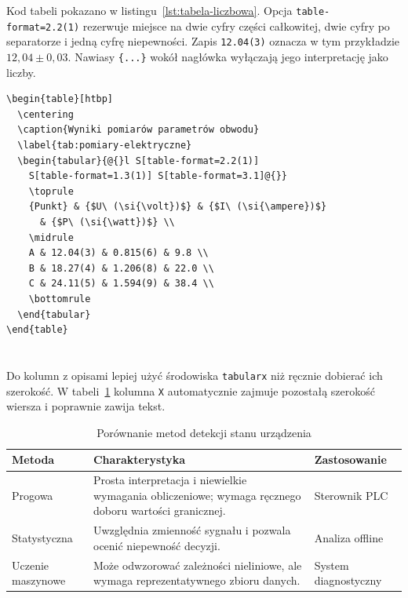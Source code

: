 Kod tabeli pokazano w listingu~\ref{lst:tabela-liczbowa}. Opcja
\verb|table-format=2.2(1)| rezerwuje miejsce na dwie cyfry części całkowitej, dwie
cyfry po separatorze i jedną cyfrę niepewności. Zapis \verb|12.04(3)| oznacza w tym
przykładzie $12{,}04\pm0{,}03$. Nawiasy \verb|{...}| wokół nagłówka wyłączają jego
interpretację jako liczby.

\begin{lstlisting}[style=thesis,caption={Kod tabeli z danymi liczbowymi},label={lst:tabela-liczbowa}]
\begin{table}[htbp]
  \centering
  \caption{Wyniki pomiarów parametrów obwodu}
  \label{tab:pomiary-elektryczne}
  \begin{tabular}{@{}l S[table-format=2.2(1)]
    S[table-format=1.3(1)] S[table-format=3.1]@{}}
    \toprule
    {Punkt} & {$U\ (\si{\volt})$} & {$I\ (\si{\ampere})$}
      & {$P\ (\si{\watt})$} \\
    \midrule
    A & 12.04(3) & 0.815(6) & 9.8 \\
    B & 18.27(4) & 1.206(8) & 22.0 \\
    C & 24.11(5) & 1.594(9) & 38.4 \\
    \bottomrule
  \end{tabular}
\end{table}
\end{lstlisting}

\section{}

Do kolumn z opisami lepiej użyć środowiska \texttt{tabularx} niż ręcznie dobierać ich
szerokość. W tabeli~\ref{tab:porownanie-metod} kolumna \texttt{X} automatycznie zajmuje
pozostałą szerokość wiersza i poprawnie zawija tekst.

\begin{table}[htbp]
  \centering
  \caption{Porównanie metod detekcji stanu urządzenia}
  \label{tab:porownanie-metod}
  \begin{tabularx}{\linewidth}{@{}lXl@{}}
    \toprule
    Metoda & Charakterystyka & Zastosowanie \\
    \midrule
    Progowa & Prosta interpretacja i niewielkie wymagania obliczeniowe;
      wymaga ręcznego doboru wartości granicznej. & Sterownik PLC \\
    Statystyczna & Uwzględnia zmienność sygnału i pozwala ocenić niepewność decyzji. & Analiza offline \\
    Uczenie maszynowe & Może odwzorować zależności nieliniowe, ale wymaga reprezentatywnego zbioru danych. & System diagnostyczny \\
    \bottomrule
  \end{tabularx}
\end{table}
\FloatBarrier

